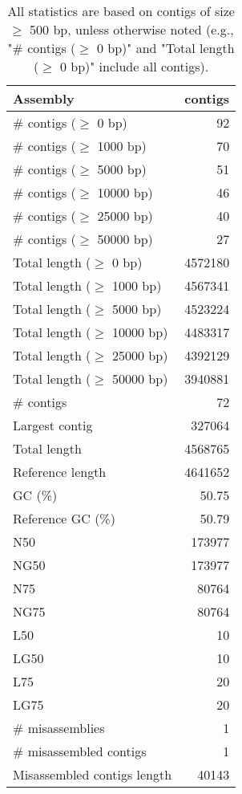 \documentclass[12pt,a4paper]{article}
\begin{document}
\begin{table}[ht]
\begin{center}
\caption{All statistics are based on contigs of size $\geq$ 500 bp, unless otherwise noted (e.g., "\# contigs ($\geq$ 0 bp)" and "Total length ($\geq$ 0 bp)" include all contigs).}
\begin{tabular}{|l*{1}{|r}|}
\hline
Assembly & contigs \\ \hline
\# contigs ($\geq$ 0 bp) & 92 \\ \hline
\# contigs ($\geq$ 1000 bp) & 70 \\ \hline
\# contigs ($\geq$ 5000 bp) & 51 \\ \hline
\# contigs ($\geq$ 10000 bp) & 46 \\ \hline
\# contigs ($\geq$ 25000 bp) & 40 \\ \hline
\# contigs ($\geq$ 50000 bp) & 27 \\ \hline
Total length ($\geq$ 0 bp) & 4572180 \\ \hline
Total length ($\geq$ 1000 bp) & 4567341 \\ \hline
Total length ($\geq$ 5000 bp) & 4523224 \\ \hline
Total length ($\geq$ 10000 bp) & 4483317 \\ \hline
Total length ($\geq$ 25000 bp) & 4392129 \\ \hline
Total length ($\geq$ 50000 bp) & 3940881 \\ \hline
\# contigs & 72 \\ \hline
Largest contig & 327064 \\ \hline
Total length & 4568765 \\ \hline
Reference length & 4641652 \\ \hline
GC (\%) & 50.75 \\ \hline
Reference GC (\%) & 50.79 \\ \hline
N50 & 173977 \\ \hline
NG50 & 173977 \\ \hline
N75 & 80764 \\ \hline
NG75 & 80764 \\ \hline
L50 & 10 \\ \hline
LG50 & 10 \\ \hline
L75 & 20 \\ \hline
LG75 & 20 \\ \hline
\# misassemblies & 1 \\ \hline
\# misassembled contigs & 1 \\ \hline
Misassembled contigs length & 40143 \\ \hline

\end{tabular}
\end{center}
\end{table}
\end{document}
